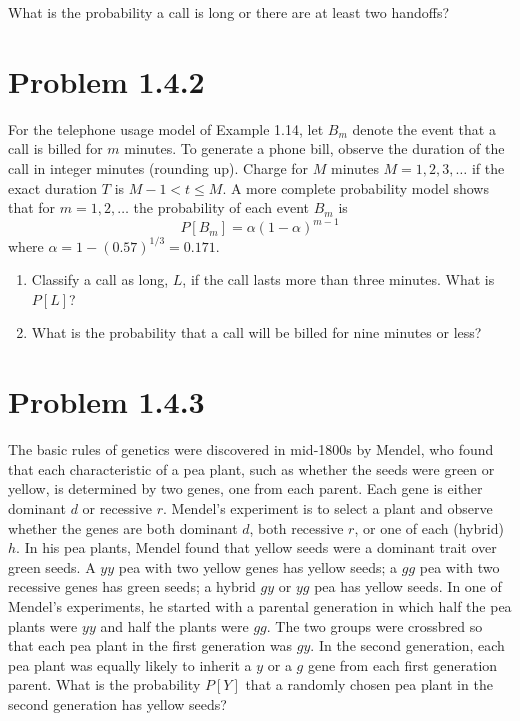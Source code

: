 \documentclass{article}
\begin{document}
\noindent
What is the probability a call is long or there are at least two handoffs?
\vspace{1.5in}

\newpage

\section*{Problem 1.4.2}
For the telephone usage model of Example 1.14, let $B_m$ denote the event that a call is billed for $m$ minutes. To generate a phone bill, observe the duration of the call in integer minutes (rounding up). Charge for $M$ minutes $M = 1, 2, 3, \dots$ if the exact duration $T$ is $M - 1 < t \le M$. A more complete probability model shows that for $m = 1, 2, \dots$ the probability of each event $B_m$ is
\[ P[B_m] = \alpha(1 - \alpha)^{m-1} \]
where $\alpha = 1 - (0.57)^{1/3} = 0.171$.

\begin{enumerate}[label=(\alph*)]
    \item Classify a call as long, $L$, if the call lasts more than three minutes. What is $P[L]$?
    \vspace{2in}
    \item What is the probability that a call will be billed for nine minutes or less?
    \vspace{2in}
\end{enumerate}

\newpage

\section*{Problem 1.4.3}
The basic rules of genetics were discovered in mid-1800s by Mendel, who found that each characteristic of a pea plant, such as whether the seeds were green or yellow, is determined by two genes, one from each parent. Each gene is either dominant $d$ or recessive $r$. Mendel's experiment is to select a plant and observe whether the genes are both dominant $d$, both recessive $r$, or one of each (hybrid) $h$. In his pea plants, Mendel found that yellow seeds were a dominant trait over green seeds. A $yy$ pea with two yellow genes has yellow seeds; a $gg$ pea with two recessive genes has green seeds; a hybrid $gy$ or $yg$ pea has yellow seeds. In one of Mendel's experiments, he started with a parental generation in which half the pea plants were $yy$ and half the plants were $gg$. The two groups were crossbred so that each pea plant in the first generation was $gy$. In the second generation, each pea plant was equally likely to inherit a $y$ or a $g$ gene from each first generation parent. What is the probability $P[Y]$ that a randomly chosen pea plant in the second generation has yellow seeds?
\vspace{3in}
\end{document}

